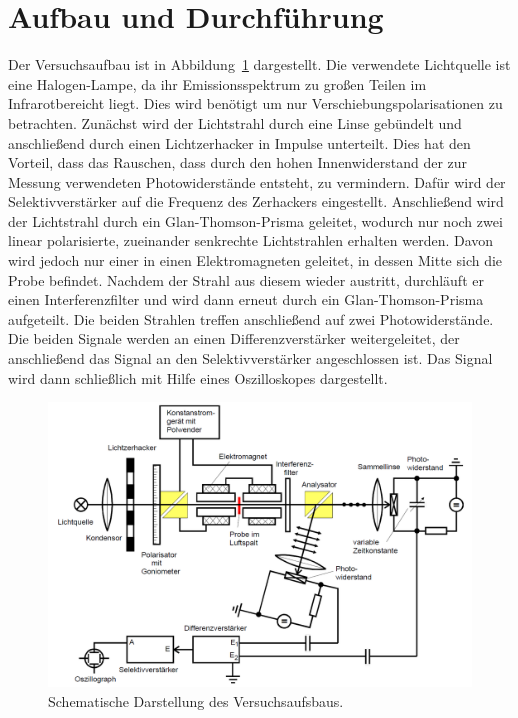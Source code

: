 \section{Aufbau und Durchführung}
Der Versuchsaufbau ist in Abbildung~\ref{fig:aufbau} dargestellt. Die verwendete Lichtquelle ist eine Halogen-Lampe, da ihr Emissionsspektrum
zu großen Teilen im Infrarotbereicht liegt. Dies wird benötigt um nur Verschiebungspolarisationen zu betrachten. Zunächst wird der Lichtstrahl durch
eine Linse gebündelt und anschließend durch einen Lichtzerhacker in Impulse unterteilt. Dies hat den Vorteil, dass das Rauschen, dass durch den hohen
Innenwiderstand der zur Messung verwendeten Photowiderstände entsteht, zu vermindern. Dafür wird der Selektivverstärker auf die Frequenz des Zerhackers eingestellt.
Anschließend wird der Lichtstrahl durch ein Glan-Thomson-Prisma geleitet, wodurch nur noch zwei linear polarisierte, zueinander senkrechte Lichtstrahlen
erhalten werden. Davon wird jedoch nur einer in einen Elektromagneten geleitet, in dessen Mitte sich die Probe befindet. Nachdem der Strahl aus
diesem wieder austritt, durchläuft er einen Interferenzfilter und wird dann erneut durch ein Glan-Thomson-Prisma aufgeteilt. Die beiden Strahlen treffen
anschließend auf zwei Photowiderstände. Die beiden Signale werden an einen Differenzverstärker weitergeleitet, der anschließend das Signal an den Selektivverstärker
angeschlossen ist. Das Signal wird dann schließlich mit Hilfe eines Oszilloskopes dargestellt.\\

\begin{figure}
  \centering
  \includegraphics[scale=0.35]{graphics/aufbau.png}
  \caption{Schematische Darstellung des Versuchsaufsbaus.}
  \label{fig:aufbau}
\end{figure}

